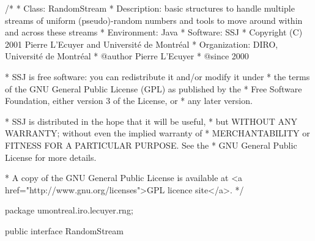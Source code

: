 \begin{code}
\begin{hide}
/*
 * Class:        RandomStream
 * Description:  basic structures to handle multiple streams of uniform
                 (pseudo)-random numbers and tools to move around within
                 and across these streams
 * Environment:  Java
 * Software:     SSJ 
 * Copyright (C) 2001  Pierre L'Ecuyer and Université de Montréal
 * Organization: DIRO, Université de Montréal
 * @author       Pierre L'Ecuyer
 * @since        2000

 * SSJ is free software: you can redistribute it and/or modify it under
 * the terms of the GNU General Public License (GPL) as published by the
 * Free Software Foundation, either version 3 of the License, or
 * any later version.

 * SSJ is distributed in the hope that it will be useful,
 * but WITHOUT ANY WARRANTY; without even the implied warranty of
 * MERCHANTABILITY or FITNESS FOR A PARTICULAR PURPOSE.  See the
 * GNU General Public License for more details.

 * A copy of the GNU General Public License is available at
   <a href="http://www.gnu.org/licenses">GPL licence site</a>.
 */
\end{hide}
package umontreal.iro.lecuyer.rng;

public interface RandomStream \begin{hide} { \end{hide}
\end{code}

